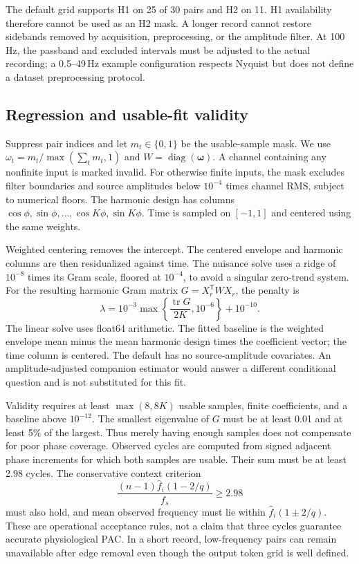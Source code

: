 \documentclass[10pt,twocolumn,letterpaper]{article}
\begin{document}
The default grid supports H1 on 25 of 30 pairs and H2 on 11.
H1 availability therefore cannot be used as an H2 mask.
A longer record cannot restore sidebands removed by acquisition,
preprocessing, or the amplitude filter. At 100\,Hz, the passband and
excluded intervals must be adjusted to the actual recording; a
0.5--49\,Hz example configuration respects Nyquist but does not define
a dataset preprocessing protocol.

\subsection{Regression and usable-fit validity}
\label{app:operator-fit}
Suppress pair indices and let $m_t\in\{0,1\}$ be the usable-sample
mask. We use $\omega_t=m_t/\max(\sum_t m_t,1)$ and
$W=\operatorname{diag}(\boldsymbol\omega)$. A channel containing any
nonfinite input is marked invalid. For otherwise finite inputs, the
mask excludes filter boundaries and source amplitudes below
$10^{-4}$ times channel RMS, subject to numerical floors. The harmonic
design has columns
$\cos\phi,\sin\phi,\ldots,\cos K\phi,\sin K\phi$.
Time is sampled on $[-1,1]$ and centered using the same weights.

Weighted centering removes the intercept. The centered envelope and
harmonic columns are then residualized against time. The nuisance
solve uses a ridge of $10^{-8}$ times its Gram scale, floored at
$10^{-4}$, to avoid a singular zero-trend system. For the resulting
harmonic Gram matrix $G=X_r^{\mathsf T}WX_r$, the penalty is
\begin{equation}
\lambda=10^{-3}\max\left\{
          \frac{\operatorname{tr}G}{2K},10^{-6}\right\}+10^{-10}.
\label{eq:ridge-scale}
\end{equation}
The linear solve uses float64 arithmetic. The fitted baseline is the
weighted envelope mean minus the mean harmonic design times the
coefficient vector; the time column is centered. The default has no
source-amplitude covariates. An amplitude-adjusted companion estimator
would answer a different conditional question and is not substituted
for this fit.

Validity requires at least $\max(8,8K)$ usable samples, finite
coefficients, and a baseline above $10^{-12}$. The smallest eigenvalue
of $G$ must be at least 0.01 and at least 5\% of the largest. Thus
merely having enough samples does not compensate for poor phase
coverage. Observed cycles are computed from signed adjacent phase
increments for which both samples are usable. Their sum must be at
least 2.98 cycles. The conservative context criterion
\begin{equation}
\frac{(n-1)\hat f_i(1-2/q)}{f_s}\geq2.98
\label{eq:cycle-gate}
\end{equation}
must also hold, and mean observed frequency must lie within
$\hat f_i(1\pm2/q)$. These are operational acceptance rules, not a
claim that three cycles guarantee accurate physiological PAC.
In a short record, low-frequency pairs can remain unavailable after
edge removal even though the output token grid is well defined.
\end{document}
